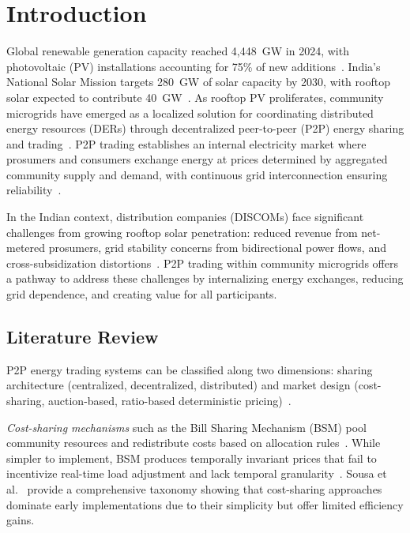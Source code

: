 \documentclass[pdflatex,sn-mathphys-num]{sn-jnl}
\theoremstyle{thmstyleone}
\theoremstyle{thmstyletwo}
\begin{document}

\maketitle

\section{Introduction}\label{sec:intro}

Global renewable generation capacity reached 4,448~GW in 2024, with photovoltaic (PV) installations accounting for 75\% of new additions~\cite{irena2025}. India's National Solar Mission targets 280~GW of solar capacity by 2030, with rooftop solar expected to contribute 40~GW~\cite{mnre2024}. As rooftop PV proliferates, community microgrids have emerged as a localized solution for coordinating distributed energy resources (DERs) through decentralized peer-to-peer (P2P) energy sharing and trading~\cite{sousa2019}. P2P trading establishes an internal electricity market where prosumers and consumers exchange energy at prices determined by aggregated community supply and demand, with continuous grid interconnection ensuring reliability~\cite{zhou2023}.

In the Indian context, distribution companies (DISCOMs) face significant challenges from growing rooftop solar penetration: reduced revenue from net-metered prosumers, grid stability concerns from bidirectional power flows, and cross-subsidization distortions~\cite{singh2021}. P2P trading within community microgrids offers a pathway to address these challenges by internalizing energy exchanges, reducing grid dependence, and creating value for all participants.

\subsection{Literature Review}

P2P energy trading systems can be classified along two dimensions: sharing architecture (centralized, decentralized, distributed) and market design (cost-sharing, auction-based, ratio-based deterministic pricing)~\cite{domenech2022}.

\textit{Cost-sharing mechanisms} such as the Bill Sharing Mechanism (BSM) pool community resources and redistribute costs based on allocation rules~\cite{long2017}. While simpler to implement, BSM produces temporally invariant prices that fail to incentivize real-time load adjustment and lack temporal granularity~\cite{zhang2018}. Sousa et al.~\cite{sousa2019} provide a comprehensive taxonomy showing that cost-sharing approaches dominate early implementations due to their simplicity but offer limited efficiency gains.
\end{document}
